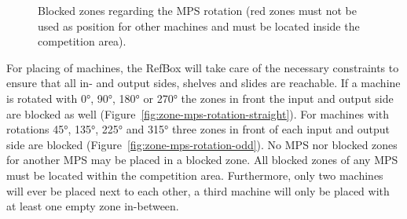 \documentclass[12pt,twoside]{article}
\newcommand{\reffig}[1]{Figure~\ref{#1}}
\begin{document}
\begin{figure}[t!]
    \centering
    \quad
    \caption{Blocked zones regarding the MPS rotation (red zones must
      not be used as position for other machines and must be located inside the competition area).}
    \label{fig:zone-mps-blocked}
\end{figure}
For placing of machines, the RefBox will take care of the necessary
constraints to ensure that all in- and output sides, shelves and
slides are reachable.  If a machine is rotated with \ang{0}, \ang{90},
\ang{180} or \ang{270} the zones in front the input and output side
are blocked as well (\reffig{fig:zone-mps-rotation-straight}).  For
machines with rotations \ang{45}, \ang{135}, \ang{225} and \ang{315}
three zones in front of each input and output side are blocked
(\reffig{fig:zone-mps-rotation-odd}). No MPS nor blocked zones for another MPS may be placed in a
blocked zone. All blocked zones of any MPS must be located within the
competition area. Furthermore, only two machines will ever be placed
next to each other, a third machine will only be placed with at least
one empty zone in-between.
\end{document}
